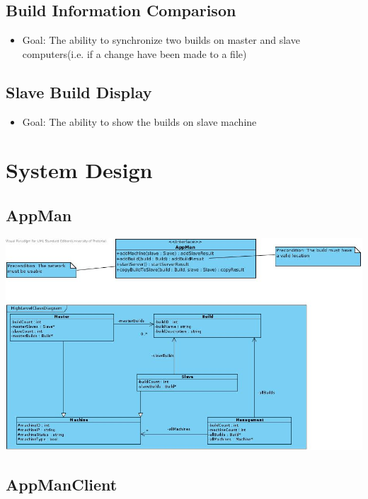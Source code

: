 \documentclass[a4paper,12pt,final]{article}
\begin{document}
\subsection{Build Information Comparison}
\begin{itemize}
\item Goal: The ability to synchronize two builds on master and slave computers(i.e. if a change have been made to a file)
\end{itemize}
\subsection{Slave Build Display}
\begin{itemize}
\item Goal: The ability to show the builds on slave machine
\end{itemize}

\section{System Design}
\subsection{AppMan}

\begin{center}
\includegraphics[scale=0.5]{AppManDiagram.jpg} 
\end{center}

\subsection{AppManClient}
\end{document}
